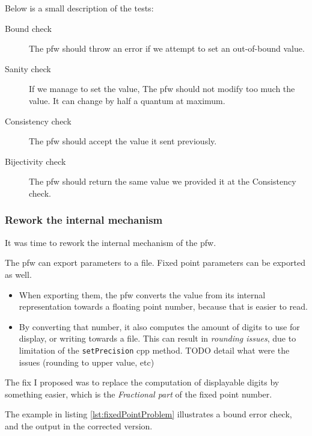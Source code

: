 Below is a small description of the tests:
\begin{description}
    \item[Bound check] The \gls{pfw} should throw an error if we
        attempt to set an out-of-bound value.
    \item[Sanity check] If we manage to set the value, The \gls{pfw} should not modify too much
        the value. It can change by half a quantum at maximum.
    \item[Consistency check] The \gls{pfw} should accept the value it sent previously.
    \item[Bijectivity check] The \gls{pfw} should return the same value we provided it at the Consistency check.
\end{description}

\subsubsection{Rework the internal mechanism}
It was time to rework the internal
mechanism of the \gls{pfw}.

The \gls{pfw} can export parameters to a file. Fixed
point parameters can be exported as well.
\begin{itemize}
    \item When exporting them, the \gls{pfw} converts the value from
        its internal representation towards a floating point number, because that is
        easier to read.
    \item By converting that number, it also computes the amount of digits
        to use for display, or writing towards a file. This can result in
        \emph{rounding issues}, due to limitation of the \lstinline{setPrecision} \gls{cpp} method.
        TODO detail what were the issues (rounding to upper value, etc)
\end{itemize}
The fix I proposed was to replace the computation of displayable digits by something
easier, which is the \emph{Fractional part} of the fixed point number.

The example in listing \ref {lst:fixedPointProblem} illustrates a bound error check, and the output in the corrected version.



